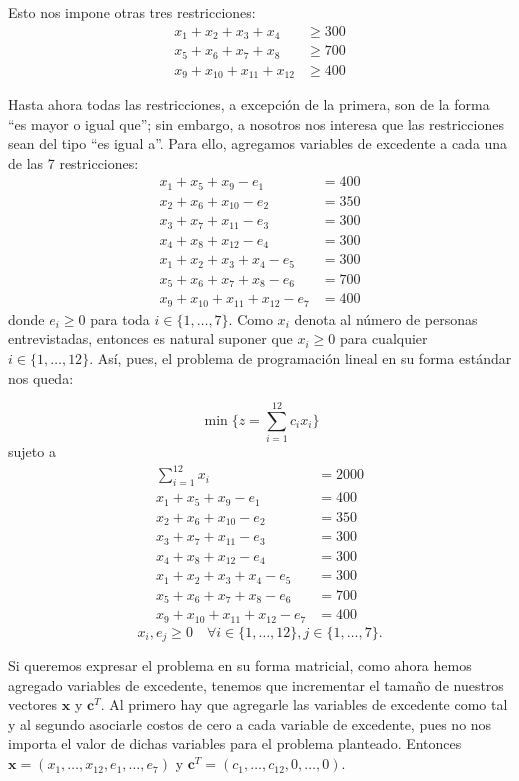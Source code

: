 \documentclass[12pt]{article}
\begin{document}
Esto nos impone otras tres restricciones:
\begin{align*}
    x_1 + x_2 + x_3 + x_4 &\geq 300 \\
    x_5 + x_6 + x_7 + x_8 &\geq 700 \\
    x_9 + x_{10} + x_{11} + x_{12} &\geq 400 
\end{align*}

Hasta ahora todas las restricciones, a excepción de la primera, son de la forma ``es mayor o igual que''; sin embargo, a nosotros nos interesa que las restricciones sean del tipo ``es igual a''. Para ello, agregamos variables de excedente a cada una de las 7 restricciones:
\begin{align*}
    x_1 + x_5 + x_9 - e_1&= 400 \\
    x_2 + x_6 + x_{10} - e_2&= 350 \\
    x_3 + x_7 + x_{11} - e_3&= 300 \\
    x_4 + x_8 + x_{12} - e_4&= 300 \\
    x_1 + x_2 + x_3 + x_4 - e_5&= 300 \\
    x_5 + x_6 + x_7 + x_8 - e_6&= 700 \\
    x_9 + x_{10} + x_{11} + x_{12} - e_7&= 400 
\end{align*}
donde $e_i \geq 0$ para toda $i \in \{1, \ldots, 7\}$. Como $x_i$ denota al número de personas entrevistadas, entonces es natural suponer que $x_i \geq 0$ para cualquier $i \in \{1, \ldots, 12\}$. Así, pues, el problema de programación lineal en su forma estándar nos queda:

\[ \min \biggl\{ z = \sum_{i=1}^{12} c_i x_{i} \biggr\} \]
sujeto a
\begin{align*}
    \sum_{i=1}^{12} x_i &= 2000 \\
    x_1 + x_5 + x_9 - e_1&= 400 \\
    x_2 + x_6 + x_{10} - e_2&= 350 \\
    x_3 + x_7 + x_{11} - e_3&= 300 \\
    x_4 + x_8 + x_{12} - e_4&= 300 \\
    x_1 + x_2 + x_3 + x_4 - e_5&= 300 \\
    x_5 + x_6 + x_7 + x_8 - e_6&= 700 \\
    x_9 + x_{10} + x_{11} + x_{12} - e_7&= 400    
\end{align*}
\[ x_i, e_j \geq 0 \quad \forall i \in \{1,\ldots,12\}, j \in \{1,\ldots,7\}. \]

Si queremos expresar el problema en su forma matricial, como ahora hemos agregado variables de excedente, tenemos que incrementar el tamaño de nuestros vectores $\pmb{x}$ y $\pmb{c}^T$. Al primero hay que agregarle las variables de excedente como tal y al segundo asociarle costos de cero a cada variable de excedente, pues no nos importa el valor de dichas variables para el problema planteado. Entonces $\pmb{x} = (x_1, \ldots, x_{12}, e_1, \ldots, e_7)$ y $\pmb{c}^T = (c_1, \ldots, c_{12}, 0, \ldots, 0)$.
\end{document}
